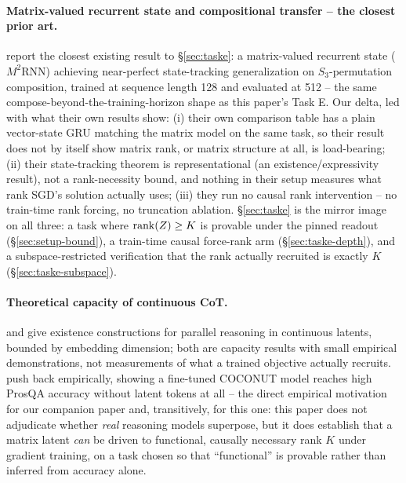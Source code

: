 \paragraph{Matrix-valued recurrent state and compositional transfer -- the
closest prior art.} \citet{mishra2026m2rnn} report the closest existing
result to \S\ref{sec:taske}: a matrix-valued recurrent state ($M^2$RNN)
achieving near-perfect state-tracking generalization on $S_3$-permutation
composition, trained at sequence length 128 and evaluated at 512 -- the
same compose-beyond-the-training-horizon shape as this paper's Task E. Our
delta, led with what their own results show: (i) their own comparison
table has a plain vector-state GRU matching the matrix model on the same
task, so their result does not by itself show matrix rank, or matrix
structure at all, is load-bearing; (ii) their state-tracking theorem is
representational (an existence/expressivity result), not a rank-necessity
bound, and nothing in their setup measures what rank SGD's solution
actually uses; (iii) they run no causal rank intervention -- no train-time
rank forcing, no truncation ablation. \S\ref{sec:taske} is the mirror
image on all three: a task where $\operatorname{rank}(Z)\geq K$ is provable under the
pinned readout (\S\ref{sec:setup-bound}), a train-time causal force-rank
arm (\S\ref{sec:taske-depth}), and a subspace-restricted verification that
the rank actually recruited is exactly $K$ (\S\ref{sec:taske-subspace}).

\paragraph{Theoretical capacity of continuous CoT.} \citet{zhu2025superposition}
and \citet{gozeten2025cot2} give existence constructions for parallel
reasoning in continuous latents, bounded by embedding dimension; both are
capacity results with small empirical demonstrations, not measurements of
what a trained objective actually recruits. \citet{rizvi2026illusion}
push back empirically, showing a fine-tuned COCONUT model reaches high
ProsQA accuracy without latent tokens at all -- the direct empirical
motivation for our companion paper \citep{larson2026gradient} and,
transitively, for this one: this paper does not adjudicate whether
\emph{real} reasoning models superpose, but it does establish that a
matrix latent \emph{can} be driven to functional, causally necessary rank
$K$ under gradient training, on a task chosen so that ``functional'' is
provable rather than inferred from accuracy alone.

